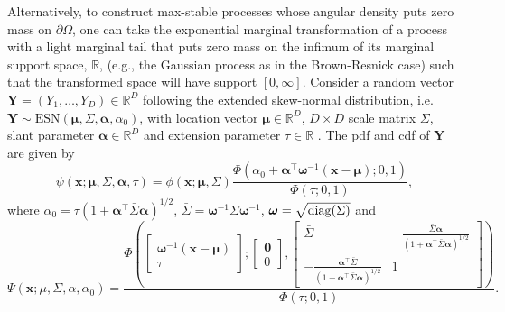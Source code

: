 \documentclass[lineno]{biometrika}
\begin{document}
Alternatively, to construct max-stable processes whose angular density puts zero mass on $\partial\Omega$, one can take the exponential marginal transformation of a process with a light marginal tail that puts zero mass on the infimum of its marginal support space, $\mathbb R$, (e.g., the Gaussian process as in the Brown-Resnick case) such that the transformed space will have support $[0,\infty]$.  
%
Consider a random vector $\bm Y=(Y_1,\dots, Y_D) \in \mathbb{R}^D$ following the extended skew-normal distribution, i.e.~$\bm Y \sim \text{ESN}(\bm\mu,\Sigma,\bm\alpha,\alpha_0)$, with location vector $\bm\mu \in \mathbb{R}^D$, $D \times D$ scale matrix $\Sigma$, slant parameter $\bm \alpha \in \mathbb{R}^D$ and extension parameter $\tau \in \mathbb{R}$ \citep[see][Chapter 5]{Azzalini:2013}. The pdf and cdf of $\bm Y$ are given by 
%
%
$$
\psi(\bm x;\bm \mu,\Sigma,\bm \alpha,\tau) = 
\phi(\bm x;\bm \mu,\Sigma) 
\frac{\Phi\left(\alpha_0 + \bm\alpha^\top \bm \omega^{-1}\left(\bm x-\bm\mu\right); 0, 1\right)}{\Phi\left(\tau; 0, 1\right)},
$$
%
where $\alpha_0 = \tau \left(1+\bm\alpha^\top\bar\Sigma\bm\alpha \right)^{1/2}$, $\bar\Sigma = \bm \omega^{-1}\Sigma \bm \omega^{-1}$, $\bm \omega = \sqrt{{\rm diag}(\Sigma)}$ and
\begin{equation*}
    \Psi(\bm x;\mu,\Sigma,\alpha,\alpha_0) =
    \frac{\Phi \left(
    \begin{bmatrix} 
        \bm \omega^{-1}( \bm x- \bm \mu)  \\
        \tau
    \end{bmatrix};
    \begin{bmatrix} 
    \bm 0 \\ 0
    \end{bmatrix},
    \begin{bmatrix}
        \bar\Sigma & -\frac{\bar{\Sigma}\bm\alpha}{(1+\bm\alpha^\top\bar{\Sigma}\bm\alpha)^{1/2}} \\
       -\frac{\bm\alpha^\top\bar{\Sigma}}{\left(1+\bm\alpha^\top\bar{\Sigma}\bm\alpha\right)^{1/2}} &	1
    \end{bmatrix} \right)
    }
    {\Phi\left(\tau; 0, 1\right)}.
\end{equation*}
\end{document}
